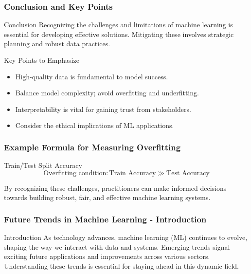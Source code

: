 \documentclass{beamer}
\begin{document}
\begin{frame}[fragile]
    \frametitle{Conclusion and Key Points}

    \begin{block}{Conclusion}
        Recognizing the challenges and limitations of machine learning is essential for developing effective solutions. Mitigating these involves strategic planning and robust data practices.
    \end{block}

    \begin{block}{Key Points to Emphasize}
        \begin{itemize}
            \item High-quality data is fundamental to model success.
            \item Balance model complexity; avoid overfitting and underfitting.
            \item Interpretability is vital for gaining trust from stakeholders.
            \item Consider the ethical implications of ML applications.
        \end{itemize}
    \end{block}
\end{frame}

\begin{frame}[fragile]
    \frametitle{Example Formula for Measuring Overfitting}

    \begin{block}{Train/Test Split Accuracy}
        \[
        \text{Overfitting condition}: \text{Train Accuracy} \gg \text{Test Accuracy}
        \]
    \end{block}

    By recognizing these challenges, practitioners can make informed decisions towards building robust, fair, and effective machine learning systems.
\end{frame}

\begin{frame}[fragile]
    \frametitle{Future Trends in Machine Learning - Introduction}
    \begin{block}{Introduction}
        As technology advances, machine learning (ML) continues to evolve, shaping the way we interact with data and systems. Emerging trends signal exciting future applications and improvements across various sectors. Understanding these trends is essential for staying ahead in this dynamic field.
    \end{block}
\end{frame}
\end{document}
